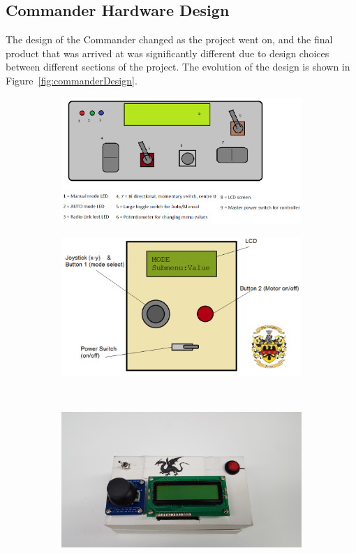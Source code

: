 \documentclass[11pt,a4paper]{article}
\begin{document}
  \subsection{Commander Hardware Design}
    The design of the Commander changed as the project went on, and the final product that was arrived at was significantly different due to design choices between different sections of the project. The evolution of the design is shown in Figure~\ref{fig:commanderDesign}.
    \begin{figure}
      \centering
      \begin{subfigure}{\textbf{Initial Commander}}
      {
        \includegraphics[width = 15cm]{initialCommander.png}}
        \end{subfigure}
      \vspace{25pt}
      \begin{subfigure}{\textbf{Intermediate Design}}
        {
        \centering
        \includegraphics[width=10cm]{draftCommander.png}
        }
      \end{subfigure}
      \vspace{25pt}
      \\
      \begin{subfigure}{\textbf{Final Commander Design}}
        {
        \centering
        \includegraphics[width=10cm]{finalCommander.png}
}
\end{subfigure}
\end{figure}
\end{document}
